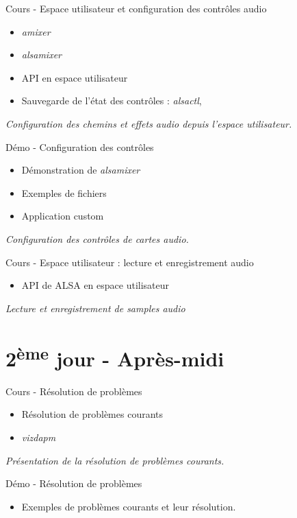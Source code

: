 \documentclass[a4paper,12pt,obeyspaces,spaces,hyphens]{article}
\begin{document}
\feagendatwocolumn
{Cours - Espace utilisateur et configuration des contrôles audio}
{
  \begin{itemize}
  \item {\em amixer}
  \item {\em alsamixer}
  \item API en espace utilisateur
  \item Sauvegarde de l'état des contrôles : {\em alsactl}, 
  \end{itemize}
  \vspace{0.5em}
  {\em Configuration des chemins et effets audio depuis l'espace utilisateur.}
}
{Démo - Configuration des contrôles}
{
  \begin{itemize}
  \item Démonstration de {\em alsamixer}
  \item Exemples de fichiers 
  \item Application custom
  \end{itemize}
  \vspace{0.5em}
  {\em Configuration des contrôles de cartes audio.}
}

\feagendaonecolumn
{Cours - Espace utilisateur : lecture et enregistrement audio}
{
  \begin{itemize}
  \item API de ALSA en espace utilisateur
  \end{itemize}
  \vspace{0.5em}
  {\em Lecture et enregistrement de samples audio}
}

\section{2\textsuperscript{ème} jour - Après-midi}

\feagendatwocolumn
{Cours - Résolution de problèmes}
{
  \begin{itemize}
  \item Résolution de problèmes courants
  \item {\em vizdapm}
  \end{itemize}
  \vspace{0.5em}
  {\em Présentation de la résolution de problèmes courants.}
}
{Démo - Résolution de problèmes}
{
  \begin{itemize}
  \item Exemples de problèmes courants et leur résolution.
  \end{itemize}
}
\end{document}
